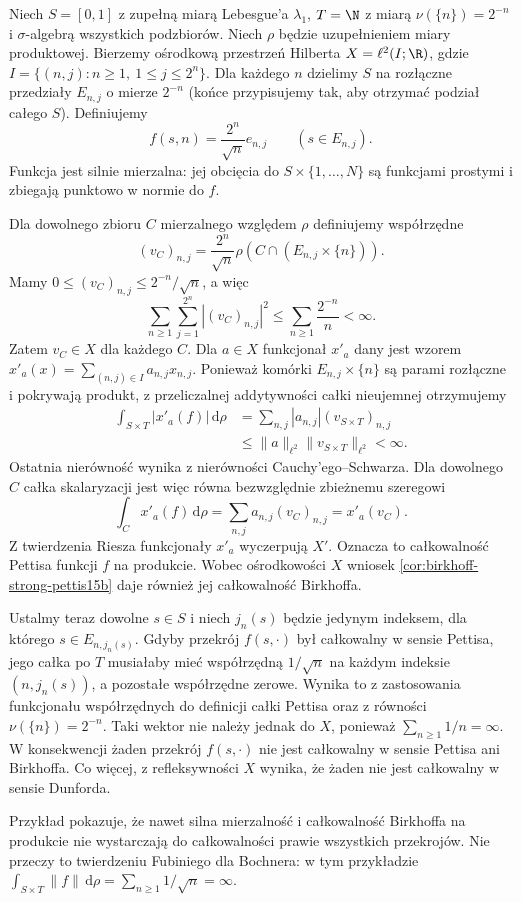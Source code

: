 \begin{przyklad}
\label{ex:birkhoff-fubini-separable-failure15b}
Niech $S=[0,1]$ z zupełną miarą Lebesgue'a $\lambda_1$,
$T=\N$ z miarą $\nu(\{n\})=2^{-n}$ i $\sigma$-algebrą
wszystkich podzbiorów. Niech $\rho$ będzie uzupełnieniem
miary produktowej. Bierzemy ośrodkową przestrzeń Hilberta
$X=\ell^2(I;\R)$, gdzie
$I=\{(n,j):n\ge1,\ 1\le j\le 2^n\}$.
Dla każdego $n$ dzielimy $S$ na rozłączne przedziały
$E_{n,j}$ o mierze $2^{-n}$ (końce przypisujemy tak,
aby otrzymać podział całego $S$).
Definiujemy
\[
 f(s,n)=\frac{2^n}{\sqrt n}e_{n,j}
 \qquad(s\in E_{n,j}).
\]
Funkcja jest silnie mierzalna: jej obcięcia do
$S\times\{1,\ldots,N\}$ są funkcjami prostymi
i zbiegają punktowo w normie do $f$.

Dla dowolnego zbioru $C$ mierzalnego względem $\rho$
definiujemy współrzędne
\[
 (v_C)_{n,j}=\frac{2^n}{\sqrt n}
              \rho(C\cap(E_{n,j}\times\{n\})).
\]
Mamy $0\le(v_C)_{n,j}\le 2^{-n}/\sqrt n$, a więc
\[
 \sum_{n\ge1}\sum_{j=1}^{2^n}|(v_C)_{n,j}|^2
 \le\sum_{n\ge1}\frac{2^{-n}}{n}<\infty.
\]
Zatem $v_C\in X$ dla każdego $C$.
Dla $a\in X$ funkcjonał $x'_a$ dany jest wzorem
$x'_a(x)=\sum_{(n,j)\in I}a_{n,j}x_{n,j}$.
Ponieważ komórki $E_{n,j}\times\{n\}$ są parami
rozłączne i pokrywają produkt, z przeliczalnej
addytywności całki nieujemnej otrzymujemy
\[
 \begin{aligned}
 \int_{S\times T}|x'_a(f)|\,\mathrm d\rho
 &=\sum_{n,j}|a_{n,j}|(v_{S\times T})_{n,j}\\
 &\le\|a\|_{\ell^2}\|v_{S\times T}\|_{\ell^2}<\infty.
 \end{aligned}
\]
Ostatnia nierówność wynika z nierówności
Cauchy'ego--Schwarza. Dla dowolnego $C$ całka
skalaryzacji jest więc równa bezwzględnie
zbieżnemu szeregowi
\[
 \int_C x'_a(f)\,\mathrm d\rho
 =\sum_{n,j}a_{n,j}(v_C)_{n,j}=x'_a(v_C).
\]
Z twierdzenia Riesza funkcjonały $x'_a$ wyczerpują
$X'$. Oznacza to całkowalność Pettisa funkcji $f$
na produkcie. Wobec ośrodkowości $X$ wniosek
\ref{cor:birkhoff-strong-pettis15b} daje również
jej całkowalność Birkhoffa.

Ustalmy teraz dowolne $s\in S$ i niech $j_n(s)$
będzie jedynym indeksem, dla którego $s\in E_{n,j_n(s)}$.
Gdyby przekrój $f(s,\cdot)$ był całkowalny
w sensie Pettisa, jego całka po $T$ musiałaby
mieć współrzędną $1/\sqrt n$ na każdym indeksie
$(n,j_n(s))$, a pozostałe współrzędne zerowe.
Wynika to z zastosowania funkcjonału współrzędnych
do definicji całki Pettisa oraz z równości
$\nu(\{n\})=2^{-n}$. Taki wektor nie należy
jednak do $X$, ponieważ $\sum_{n\ge1}1/n=\infty$.
W konsekwencji żaden przekrój $f(s,\cdot)$
nie jest całkowalny w sensie Pettisa ani Birkhoffa.
Co więcej, z refleksywności $X$ wynika, że
żaden nie jest całkowalny w sensie Dunforda.

Przykład pokazuje, że nawet silna mierzalność
i całkowalność Birkhoffa na produkcie nie wystarczają
do całkowalności prawie wszystkich przekrojów.
Nie przeczy to twierdzeniu Fubiniego dla Bochnera:
w tym przykładzie
$\int_{S\times T}\|f\|\,\mathrm d\rho
=\sum_{n\ge1}1/\sqrt n=\infty$.
\end{przyklad}

